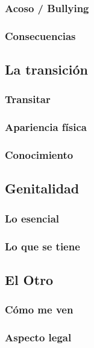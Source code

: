 \subsubsection{Acoso / Bullying}

\subsubsection{Consecuencias}

\subsection{La transición}

\subsubsection{Transitar}

\subsubsection{Apariencia física}

\subsubsection{Conocimiento}

\subsection{Genitalidad}

\subsubsection{Lo esencial}

\subsubsection{Lo que se tiene}

\subsection{El Otro}

\subsubsection{Cómo me ven}

\subsubsection{Aspecto legal}
